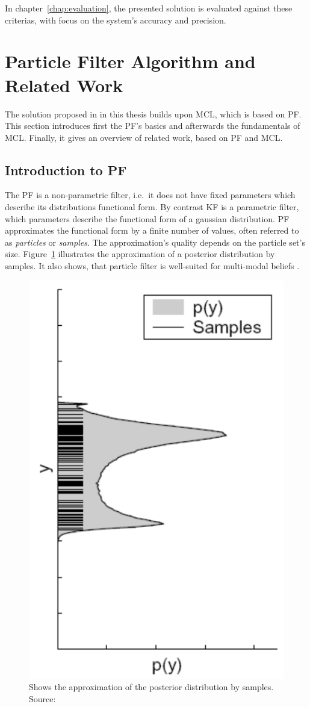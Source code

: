 \noindent In chapter~\ref{chap:evaluation}, the presented solution is evaluated against these criterias, with focus on the system's accuracy and precision.


\section{Particle Filter Algorithm and Related Work}\label{sec:fund_pf}
The solution proposed in in this thesis builds upon \acf{MCL}, which is based on \acf{PF}. This section introduces first the \ac{PF}'s basics and afterwards the fundamentals of \ac{MCL}. Finally, it gives an overview of related work, based on \ac{PF} and \ac{MCL}.

\subsection{Introduction to \acl{PF}}
The \ac{PF} is a non-parametric filter, i.e.\ it does not have fixed parameters which describe its distributions functional form. By contrast \acf{KF} is a parametric filter, which parameters describe the functional form of a gaussian distribution. \ac{PF} approximates the functional form by a finite number of values, often referred to as \emph{particles} or \emph{samples}. The approximation's quality depends on the particle set's size. Figure~\ref{fig:pf_approx} illustrates the approximation of a posterior distribution by samples. It also shows, that particle filter is well-suited for multi-modal beliefs \citep{thrun:prob_robo}.

\begin{figure}
	\includegraphics[height=0.45\textwidth]{figures/pf_approx}
	\caption{Shows the approximation of the posterior distribution by samples. Source: \citep{thrun:prob_robo}}
	\label{fig:pf_approx}
\end{figure} 



